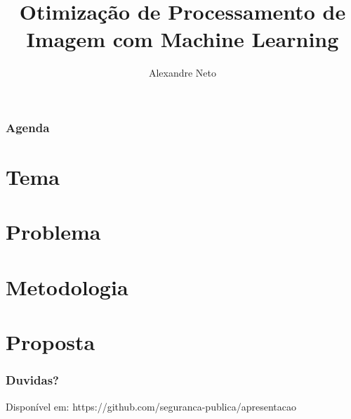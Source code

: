\documentclass[14pt]{beamer}
\author{Alexandre Neto}
\title{Otimização de Processamento de Imagem com Machine Learning}
\institute{
	Análise e Desenvolvimento de Sistemas\\
	Fatec-SJC
	}
\begin{document}
\begin{frame}
\titlepage
\end{frame}

\begin{frame}
\frametitle{Agenda}
\tableofcontents
\end{frame}

\section{Tema}


\section{Problema}


\section{Metodologia}


\section{Proposta}


\begin{frame}
	\frametitle{Duvidas?}
	Disponível em:
	https://github.com/seguranca-publica/apresentacao
\end{frame}

	
\end{document}
